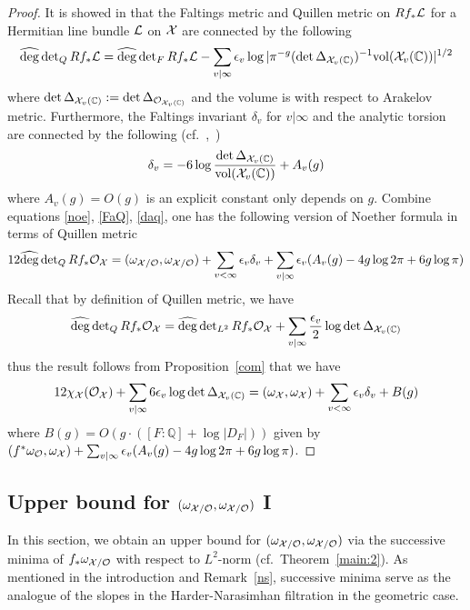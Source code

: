 \documentclass[]{amsart}
\newcommand{\BC}{{\mathbb {C}}} \newcommand{\BD}{{\mathbb {D}}}
\newcommand{\BQ}{{\mathbb {Q}}} \newcommand{\BR}{{\mathbb {R}}}
\newcommand{\CO}{{\mathcal {O}}} \newcommand{\CP}{{\mathcal {P}}}
\newcommand{\wh}{\widehat}
\theoremstyle{plain}
\theoremstyle{remark} \newtheorem{remark}[thm]{Remark}
\theoremstyle{remark} \newtheorem{exercise}{Exercise}
\theoremstyle{remark} \newtheorem{example}{Example}
\numberwithin{equation}{section}
\begin{document}
\begin{proof}
It is showed in \cite[Sec.~4.5]{Soule} that the Faltings metric and Quillen metric on $Rf_*{\mathcal {L}}$ for a Hermitian line bundle ${\mathcal {L}}$ on ${\mathcal {X}}$ are connected by the following 
\begin{equation}
  \label{FaQ}\wh{\deg}\det\nolimits_{Q} Rf_*\CL=\wh{\deg}\det\nolimits_F Rf_*\CL-\sum_{v|\infty}\epsilon_v\log| \pi^{-g}(\det \Delta_{\CX_v(\BC)})^{-1}\vol(\CX_v(\BC))|^{1/2}\end{equation}where $\det \Delta_{\CX_v(\BC)}:=\det \Delta_{\CO_{\CX_v(\BC)}}$ and the volume is with respect to Arakelov metric. Furthermore, the Faltings invariant $\delta_v$ for $v|\infty$ and the analytic torsion are connected by the following (cf.~\cite[Sec.~4.6]{Soule},~\cite{Bost:1986})
\begin{equation}\label{daq}\delta_v=-6\log \frac{\det \Delta_{\CX_v(\BC)}}{\vol(\CX_v(\BC))} +A_v(g)\end{equation}where $A_v(g)=O(g)$ is an explicit constant only depends on $g$.
Combine equations \eqref{noe}, \eqref{FaQ}, \eqref{daq}, one has the following version of Noether formula in terms of Quillen metric 
\begin{equation}12\wh{\deg}\det\nolimits_{Q} Rf_*\CO_{\CX}=(\omega_{\CX/\CO},\omega_{\CX/\CO})+\sum_{v<\infty}\epsilon_v\delta_v+\sum_{v|\infty}\epsilon_v(A_v(g)-4g\log 2\pi+6g\log\pi)\end{equation}
Recall that by definition of Quillen metric, we have
\[\wh{\deg}\det\nolimits_{Q} Rf_*\CO_{\CX}=\wh{\deg}\det\nolimits_{L^2} Rf_*\CO_{\CX}+\sum_{v|\infty}\frac{\epsilon_v}{2}\log\det \Delta_{\CX_v(\BC)}\]
thus the result follows from Proposition~\ref{com} that we have
\begin{equation}12\chi_{\CX}(\CO_{\CX})+\sum_{v|\infty}6{\epsilon_v}\log \det \Delta_{\CX_v(\BC)}=(\omega_{\CX},\omega_{\CX})+\sum_{v<\infty}\epsilon_v\delta_v+B(g)\end{equation}where $B(g)=O(g\cdot ([F:\BQ]+\log|D_F|))$ given by $(f^*\omega_{\CO},\omega_{\CX})+\sum_{v|\infty}\epsilon_v(A_v(g)-4g\log 2\pi+6g\log\pi)$.
\end{proof}

\subsection{Upper bound for $(\omega_{\CX/\CO},\omega_{\CX/\CO})$ I}\label{uppI}

In this section, we obtain an upper bound for $(\omega_{\CX/\CO},\omega_{\CX/\CO})$ via the successive minima of $f_*\omega_{\CX/\CO}$ with respect to $L^2$-norm (cf.~Theorem~\ref{main:2}). As mentioned in the introduction and Remark~\ref{ns}, successive minima serve as the analogue of the slopes in the Harder-Narasimhan filtration in the geometric case.
\end{document}
